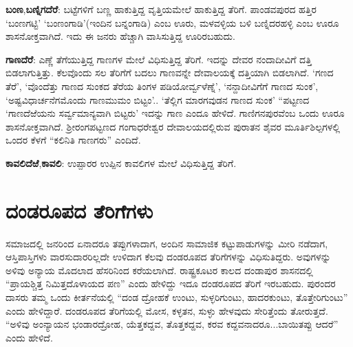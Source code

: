\textbf{ಬಂಣ},\textbf{ಬಣ್ನಿಗದೆರೆ}: ಬಟ್ಟೆಗಳಿಗೆ ಬಣ್ಣ ಹಾಕುತ್ತಿದ್ದ ವೃತ್ತಿಯಮೇಲೆ ಹಾಕುತ್ತಿದ್ದ ತೆರಿಗೆ. ಪಾಂಡವಪುರದ ಹತ್ತಿರ ‘ಬಂಣಗಟ್ಟಿ’ ‘ಬಂಣಂಗಾಡಿ’(ಇಂದಿನ ಬನ್ನಂಗಾಡಿ) ಎಂಬ ಊರು, ಮಳವಳ್ಳಿಯ ಬಳಿ ಬಣ್ನಿದರಹಳ್ಳಿ ಎಂಬ ಊರೂ ಶಾಸನೋಕ್ತವಾಗಿದೆ. ಇದು ಈ ಜನರು ಹೆಚ್ಚಾಗಿ ವಾಸಿಸುತ್ತಿದ್ದ ಊರಿರಬಹುದು. 

\textbf{ಗಾಣದೆರೆ}: ಎಣ್ಣೆ ತೆಗೆಯುತ್ತಿದ್ದ ಗಾಣಗಳ ಮೇಲೆ ವಿಧಿಸುತ್ತಿದ್ದ ತೆರಿಗೆ. ಇದನ್ನು ದೇವರ ನಂದಾದೀವಿಗೆ ದತ್ತಿ ಬಿಡಲಾಗುತ್ತಿತ್ತು. ಕೆಲವೊಂದು ಸಲ ತೆರಿಗೆಗೆ ಬದಲು ಗಾಣವನ್ನೇ ದೇವಾಲಯಕ್ಕೆ ದತ್ತಿಯಾಗಿ ಬಿಡಲಾಗಿದೆ. ‘ಗಣದ ತೆರೆ’, ‘ವೊಂದೆತ್ತು ಗಾಣದ ಸುಂಕದ ತೆರೆಯ ತಿಂಗಳ ಪಡಿಯೋರ್ವ್ವಳೆಣ್ನೆ’, ‘ನನ್ದಾದೀವಿಗೆಗೆ ಗಾಣದ ಸುಂಕ’, ‘ಅಷ್ಟವಿಧಾರ್ಚನೆಗಮೊಂದು ಗಾಣಮುಮಂ ಬಿಟ್ಟಂ’.. ‘ತೆಲ್ಲಿಗ ಮಾರಗವುಡನ ಗಾಣದ ಸುಂಕ’ “ಪಟ್ಟಣದ ‘ಗಾಣದೆಱೆಯನು ಸರ್ವ್ವಮಾನ್ಯವಾಗಿ ಬಿಟ್ಟರು’  ಇದನ್ನು ಗಾಣ ಎಂದೂ ಹೇಳಿದೆ. ಗಾಣಿಗನಪುರವೆಂಬ ಒಂದು ಊರೂ ಶಾಸನೋಕ್ತವಾಗಿದೆ. ಶ‍್ರೀರಂಗಪಟ್ಟಣದ ಗಂಗಾಧರೇಶ್ವರ ದೇವಾಲಯದಲ್ಲಿರುವ ಪುರಾತನ ಶೈವರ ಮೂರ್ತಿಶಿಲ್ಪಗಳಲ್ಲಿ ಒಂದರ ಕೆಳಗೆ “ಕಲಿನಿತಿ ಗಾಣಗರು” ಎಂದಿದೆ.

\textbf{ಕಾವಲಿದೆಱೆ},\textbf{ಕಾವಲಿ}: ಉಪ್ಪಾರರ ಉಪ್ಪಿನ ಕಾವಲಿಗಳ ಮೇಲೆ ವಿಧಿಸುತ್ತಿದ್ದ ತೆರಿಗೆ.


\section{ದಂಡರೂಪದ ತೆರಿಗೆಗಳು}

ಸಮಾಜದಲ್ಲಿ ಜನರಿಂದ ಏನಾದರೂ ತಪ್ಪುಗಳಾದಾಗ, ಅಂದಿನ ಸಾಮಾಜಿಕ ಕಟ್ಟುಪಾಡುಗಳನ್ನು ಮೀರಿ ನಡೆದಾಗ, ಆಸ್ತಿಪಾಸ್ತಿಗಳು ವಾರಸುದಾರರಿಲ್ಲದೇ ಉಳಿದಾಗ ಕೆಲವು ದಂಡರೂಪದ ತೆರಿಗೆಗಳನ್ನು ವಿಧಿಸುತಿದ್ದರು. ಅವುಗಳನ್ನು ಅಳಿವು ಅನ್ಯಾಯ ಮೊದಲಾದ ಹೆಸರಿನಿಂದ ಕರೆಯಲಾಗಿದೆ. ರಾಷ್ಟ್ರಕೂಟರ ಕಾಲದ ದಂಡಾಪುರ ಶಾಸನದಲ್ಲಿ “ಪ್ರಾಯಶ್ಚಿತ್ತ ನಿಮಿತ್ತದೊಳಾಯದ ಪಣ” ಎಂದು ಹೇಳಿದ್ದು ಇದೂ ದಂಡರೂಪದ ತೆರಿಗೆ ಇರಬಹುದು. ಪುರಂದರ ದಾಸರು ತಮ್ಮ ಒಂದು ಕೀರ್ತನೆಯಲ್ಲಿ “ದಂಡ ದ್ರೋಹಕೆ ಉಂಟು, ಸುಳ್ಳರಿಗುಂಟು, ಹಾದರಕುಂಟು, ತೊತ್ತೇರಿಗುಂಟು” ಎಂದು ಹೇಳಿದ್ದಾರೆ. ದಂಡರೂಪದ ತೆರಿಗೆಯಲ್ಲಿ ಮೋಸ, ಕಳ್ಳತನ, ಸುಳ್ಳು ಹೇಳವುದು ಸೇರಿತ್ತೆಂದು ತೋರುತ್ತದೆ. “ಅಳಿವು ಅಂನ್ಯಾಯನ ಭಂಡಾರದ್ರೋಹ, ಯೆತ್ತಕದ್ದವ, ತೊತ್ತಕದ್ದವ, ಕರವ ಕದ್ದವನಾದರೂ...ಬಾಯಿತಪ್ಪು ಆದರೆ” ಎಂದು ಹೇಳಿದೆ.

